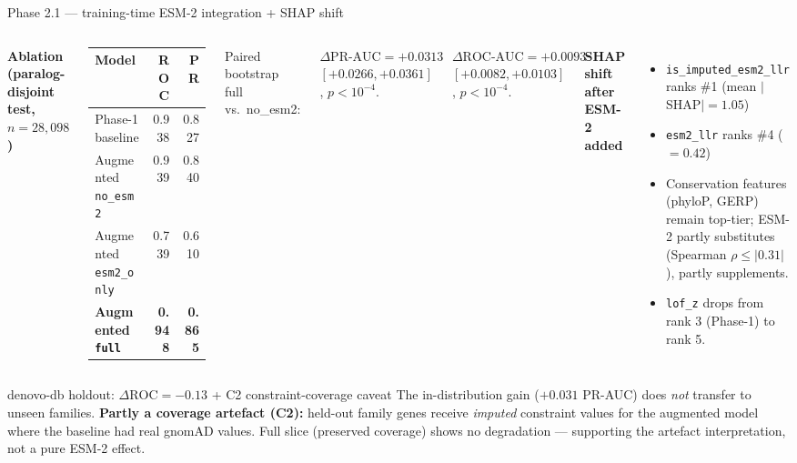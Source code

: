 \documentclass[aspectratio=169,10pt]{beamer}
\begin{document}
\begin{frame}{Phase 2.1 --- training-time ESM-2 integration + SHAP shift}
  \scriptsize
  \begin{columns}[T]
    \textbf{\textcolor{kkuGreen}{Ablation (paralog-disjoint test, $n=28{,}098$)}}
    \begin{tabular}{@{}l r r@{}}
      \toprule
      Model & ROC & PR \\
      \midrule
      Phase-1 baseline                & 0.938 & 0.827 \\
      Augmented \texttt{no\_esm2}     & 0.939 & 0.840 \\
      Augmented \texttt{esm2\_only}   & 0.739 & 0.610 \\
      \rowcolor{green!10}
      \textbf{Augmented \texttt{full}} & \textbf{0.948} & \textbf{0.865} \\
      \bottomrule
    \end{tabular}
    \vspace{0.3em}\par
    Paired bootstrap full vs.\ no\_esm2:\par
    $\Delta\text{PR-AUC} = +0.0313$ $[+0.0266, +0.0361]$, $p<10^{-4}$.\par
    $\Delta\text{ROC-AUC} = +0.0093$ $[+0.0082, +0.0103]$, $p<10^{-4}$.

    \textbf{\textcolor{kkuGreen}{SHAP shift after ESM-2 added}}
    \begin{itemize}\setlength{\itemsep}{0.05em}
      \item \texttt{is\_imputed\_esm2\_llr} ranks \#1 (mean $|$SHAP$|=1.05$)
      \item \texttt{esm2\_llr} ranks \#4 ($=0.42$)
      \item Conservation features (phyloP, GERP) remain top-tier;
            ESM-2 partly substitutes (Spearman $\rho \le |0.31|$),
            partly supplements.
      \item \texttt{lof\_z} drops from rank 3 (Phase-1) to rank 5.
    \end{itemize}
  \end{columns}

  \vspace{0.4em}
  \begin{alertblock}{denovo-db holdout: $\Delta\text{ROC} = -0.13$ + C2 constraint-coverage caveat}
    \scriptsize
    The in-distribution gain ($+0.031$ PR-AUC) does \emph{not} transfer to unseen
    families.\enspace
    \textbf{Partly a coverage artefact (C2):} held-out family genes receive
    \emph{imputed} constraint values for the augmented model where the baseline
    had real gnomAD values. Full slice (preserved coverage) shows no degradation
    --- supporting the artefact interpretation, not a pure ESM-2 effect.
  \end{alertblock}
\end{frame}
\end{document}
